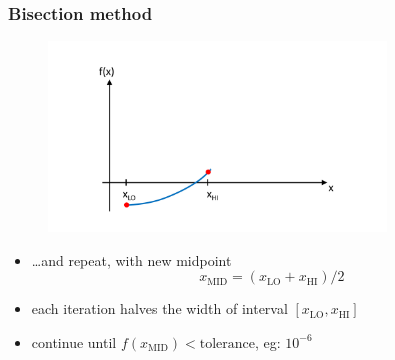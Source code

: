 \documentclass[english,14pt]{beamer}
\begin{document}

\begin{frame}[fragile]

\frametitle{Bisection method}

\vspace*{-10mm}
\begin{figure}[ht]
	\centering
	\includegraphics[width=0.8\textwidth]{figures/bisection4}
\end{figure}
\vspace*{-10mm}
\begin{itemize}
\item[] \quad\ldots and repeat, with new midpoint
\[
	x_\mathrm{MID} = (x_\mathrm{LO}+x_\mathrm{HI})/2
\]
\item each iteration halves the width of interval $[x_\mathrm{LO},x_\mathrm{HI}]$
\item continue until $f(x_\mathrm{MID}) < \mathrm{tolerance}$, eg: $10^{-6}$
\end{itemize}

\end{frame}

%
%
%
%       
%

\end{document}
